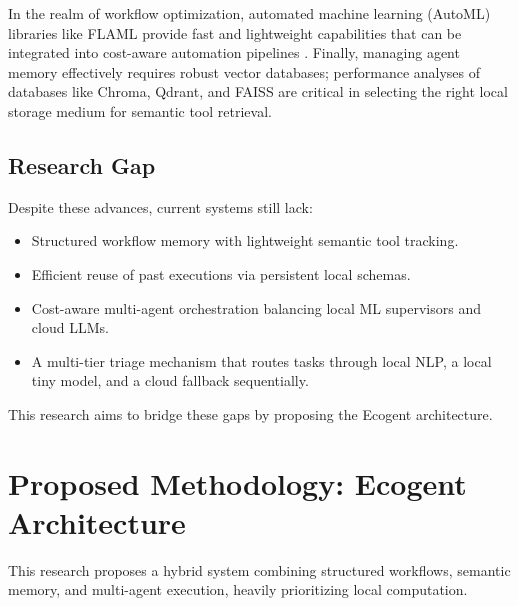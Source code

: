 \documentclass[12pt,a4paper]{article}
\begin{document}
\medskip

\noindent In the realm of workflow optimization, automated machine learning (AutoML) libraries like FLAML \cite{flaml} provide fast and lightweight capabilities that can be integrated into cost-aware automation pipelines \cite{cost_aware_automl}. Finally, managing agent memory effectively requires robust vector databases; performance analyses of databases like Chroma, Qdrant, and FAISS \cite{chroma_faiss_analysis} are critical in selecting the right local storage medium for semantic tool retrieval.

\subsection{Research Gap}
Despite these advances, current systems still lack:
\begin{itemize}
    \item Structured workflow memory with lightweight semantic tool tracking.
    \item Efficient reuse of past executions via persistent local schemas.
    \item Cost-aware multi-agent orchestration balancing local ML supervisors and cloud LLMs.
    \item A multi-tier triage mechanism that routes tasks through local NLP, a local tiny model, and a cloud fallback sequentially.
\end{itemize}
This research aims to bridge these gaps by proposing the Ecogent architecture.

\section{Proposed Methodology: Ecogent Architecture}
This research proposes a hybrid system combining structured workflows, semantic memory, and multi-agent execution, heavily prioritizing local computation.
\end{document}

